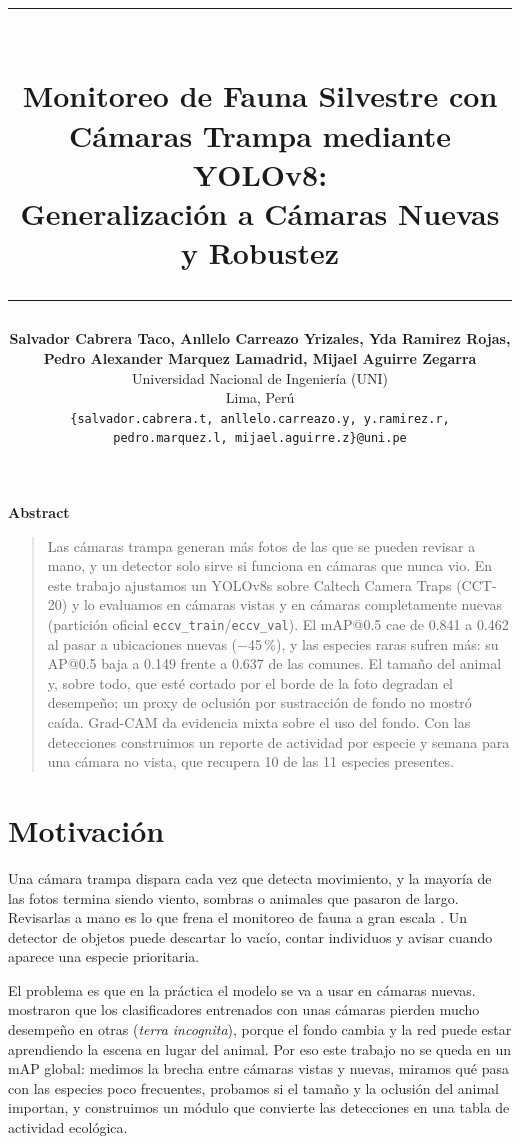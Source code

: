 \documentclass[10pt,letterpaper]{article}
\title{\vspace{-1.2em}\rule{\linewidth}{4pt}\\[1.2ex]
\bfseries Monitoreo de Fauna Silvestre con Cámaras Trampa mediante YOLOv8:\\ Generalización a Cámaras Nuevas y Robustez\\[0.6ex]
\rule{\linewidth}{0.5pt}}
\author{%
\textbf{Salvador Cabrera Taco, Anllelo Carreazo Yrizales, Yda Ramirez Rojas,}\\
\textbf{Pedro Alexander Marquez Lamadrid, Mijael Aguirre Zegarra}\\[0.3ex]
Universidad Nacional de Ingeniería (UNI) \\ Lima, Perú \\[0.3ex]
{\small\texttt{\{salvador.cabrera.t, anllelo.carreazo.y, y.ramirez.r,}}\\
{\small\texttt{pedro.marquez.l, mijael.aguirre.z\}@uni.pe}}}
\date{}
\begin{document}
\maketitle
\vspace{-1.5em}

\begin{center}\textbf{Abstract}\end{center}
\vspace{-0.8em}
\begin{quote}\small
Las cámaras trampa generan más fotos de las que se pueden revisar a mano, y un detector solo sirve si funciona en cámaras que nunca vio.
En este trabajo ajustamos un YOLOv8s sobre Caltech Camera Traps (CCT-20) y lo evaluamos en cámaras vistas y en cámaras completamente nuevas
(partición oficial \texttt{eccv\_train}/\texttt{eccv\_val}). El mAP@0.5 cae de 0.841 a 0.462 al pasar a ubicaciones nuevas ($-$45\,\%), y las especies
raras sufren más: su AP@0.5 baja a 0.149 frente a 0.637 de las comunes. El tamaño del animal y, sobre todo, que esté cortado por el borde de la foto
degradan el desempeño; un proxy de oclusión por sustracción de fondo no mostró caída. Grad-CAM da evidencia mixta sobre el uso del fondo.
Con las detecciones construimos un reporte de actividad por especie y semana para una cámara no vista, que recupera 10 de las 11 especies presentes.
\end{quote}

\section{Motivación}
Una cámara trampa dispara cada vez que detecta movimiento, y la mayoría de las fotos termina siendo viento, sombras o animales que pasaron de largo.
Revisarlas a mano es lo que frena el monitoreo de fauna a gran escala \citep{norouzzadeh2018}. Un detector de objetos puede descartar lo vacío, contar
individuos y avisar cuando aparece una especie prioritaria.

El problema es que en la práctica el modelo se va a usar en cámaras nuevas. \citet{beery2018terra} mostraron que los clasificadores entrenados con unas cámaras
pierden mucho desempeño en otras (\emph{terra incognita}), porque el fondo cambia y la red puede estar aprendiendo la escena en lugar del animal. Por eso este
trabajo no se queda en un mAP global: medimos la brecha entre cámaras vistas y nuevas, miramos qué pasa con las especies poco frecuentes, probamos si el tamaño y
la oclusión del animal importan, y construimos un módulo que convierte las detecciones en una tabla de actividad ecológica.
\end{document}
